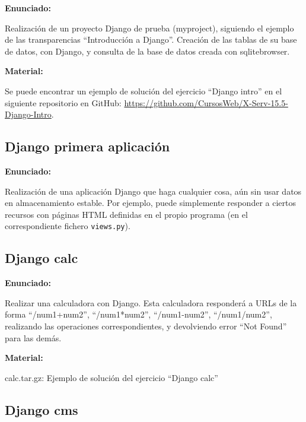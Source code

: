 \textbf{Enunciado:}

Realización de un proyecto Django de prueba (myproject), siguiendo el ejemplo de las transparencias ``Introducción a Django''. Creación de las tablas de su base de datos, con Django, y consulta de la base de datos creada con sqlitebrowser.

\textbf{Material:}

Se puede encontrar un ejemplo de solución del ejercicio ``Django intro'' en el siguiente repositorio en GitHub: \url{https://github.com/CursosWeb/X-Serv-15.5-Django-Intro}.

\subsection{Django primera aplicación}
\label{subsec:django-primera}

\textbf{Enunciado:}

Realización de una aplicación Django que haga cualquier cosa, aún sin usar datos en almacenamiento estable. Por ejemplo, puede simplemente responder a ciertos recursos con páginas HTML definidas en el propio programa (en el correspondiente fichero \texttt{views.py}).

\subsection{Django calc}
\label{subsec:django-calc}

\textbf{Enunciado:}

Realizar una calculadora con Django. Esta calculadora responderá a URLs de la forma ``/num1+num2'', ``/num1*num2'', ``/num1-num2'', ``/num1/num2'', realizando las operaciones correspondientes, y devolviendo error ``Not Found'' para las demás.

\textbf{Material:}

calc.tar.gz: Ejemplo de solución del ejercicio ``Django calc''

\subsection{Django cms}
\label{subsec:django-cms}

